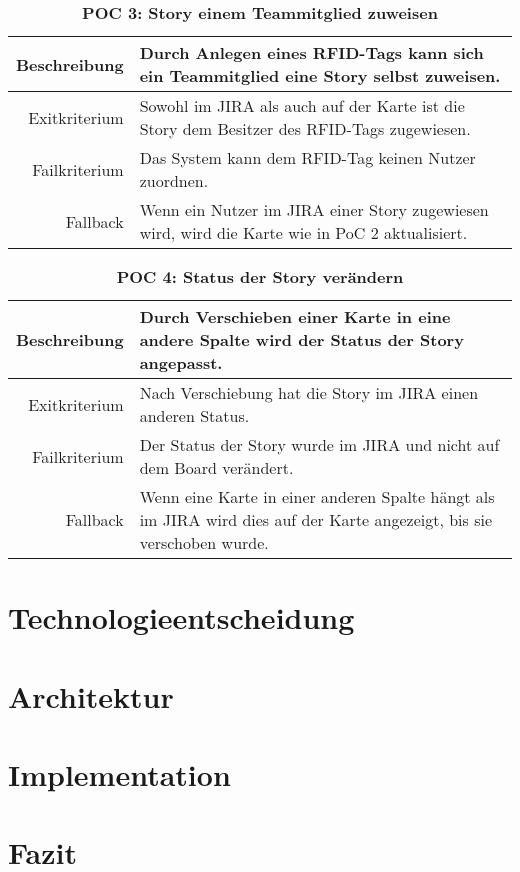 \documentclass[12pt,titlepage]{scrartcl}
\begin{document}
\begin{table}[H]
\centering
\caption{\textbf{POC 3: Story einem Teammitglied zuweisen}}
\label{poc3}
\begin{tabularx}{\linewidth}{|r|X|}
\hline
Beschreibung  & Durch Anlegen eines RFID-Tags kann sich ein Teammitglied eine Story selbst zuweisen.  \\ \hline
Exitkriterium & Sowohl im JIRA als auch auf der Karte ist die Story dem Besitzer des RFID-Tags zugewiesen. \\ \hline
Failkriterium & Das System kann dem RFID-Tag keinen Nutzer zuordnen.
 \\ \hline
Fallback      & Wenn ein Nutzer im JIRA einer Story zugewiesen wird, wird die Karte wie in PoC 2 aktualisiert. 
 \\ \hline
\end{tabularx}
\end{table}

\begin{table}[H]
\centering
\caption{\textbf{POC 4: Status der Story verändern}}
\label{poc4}
\begin{tabularx}{\linewidth}{|r|X|}
\hline
Beschreibung  & Durch Verschieben einer Karte in eine andere Spalte wird der Status der Story angepasst.  \\ \hline
Exitkriterium & Nach Verschiebung hat die Story im JIRA einen anderen Status. \\ \hline
Failkriterium & Der Status der Story wurde im JIRA und nicht auf dem Board verändert. \\ \hline
Fallback      & Wenn eine Karte in einer anderen Spalte hängt als im JIRA wird dies auf der Karte angezeigt, bis sie verschoben wurde.  \\ \hline
\end{tabularx}
\end{table}
	\newpage	
	\section{Technologieentscheidung}
	\newpage	
	\section{Architektur}
	\newpage
	\section{Implementation}
	\newpage	
	\section{Fazit}
	\newpage

	

 	
\end{document}
